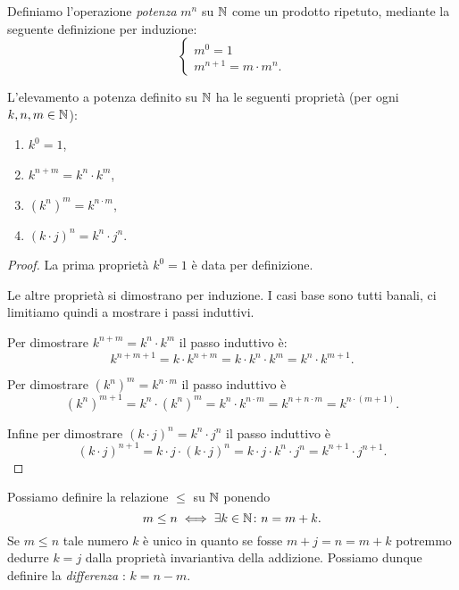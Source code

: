Definiamo l'operazione \emph{potenza} $m^n$ su ${\mathbb N}$ come un prodotto 
ripetuto, mediante la seguente definizione per induzione:
\[
\begin{cases}
  m^0 = 1\\
  m^{n+1} = m\cdot m^n.
\end{cases}  
\]
\begin{theorem}
  \label{th:proprieta_potenza}%
  L'elevamento a potenza definito su ${\mathbb N}$ ha le seguenti proprietà
  (per ogni $k,n,m\in {\mathbb N}$):
  \begin{enumerate}
    \item $k^0 = 1$,
    \item $k^{n+m} = k^n \cdot k^m$,
    \item $(k^n)^m = k^{n\cdot m}$,
    \item $(k\cdot j)^n = k^n\cdot j^n$. 
  \end{enumerate}
\end{theorem}
%
\begin{proof}
La prima proprietà $k^0=1$ è data per definizione.

Le altre proprietà si dimostrano per induzione.
I casi base sono tutti banali, ci limitiamo quindi 
a mostrare i passi induttivi.

Per dimostrare $k^{n+m}=k^n\cdot k^m$ il passo induttivo è:
\[
k^{n+m+1} 
= k\cdot k^{n+m}  
= k\cdot k^n\cdot k^m
= k^n \cdot k^{m+1}.
\]

Per dimostrare $(k^n)^m = k^{n\cdot m}$ il passo induttivo è 
\[
  (k^n)^{m+1} 
  = k^n\cdot (k^n)^m
  = k^n\cdot k^{n\cdot m}
  = k^{n+n\cdot m}
  = k^{n\cdot(m+1)}.
\]

Infine per dimostrare $(k\cdot j)^n = k^n\cdot j^n$ 
il passo induttivo è
\[
(k\cdot j)^{n+1} 
= k\cdot j\cdot (k\cdot j)^n  
= k\cdot j\cdot k^n\cdot j^n
= k^{n+1}\cdot j^{n+1}.
\]
\end{proof}

Possiamo definire la relazione $\le$ su ${\mathbb N}$ ponendo 
\[
  m \le n \iff \exists k\in {\mathbb N}\colon n = m+k.  
\]
Se $m\le n$ tale numero 
$k$ è unico in quanto se fosse $m+j=n=m+k$ potremmo dedurre $k=j$
dalla proprietà invariantiva della addizione. 
Possiamo dunque definire la \emph{differenza}%
%
: $k=n-m$.

